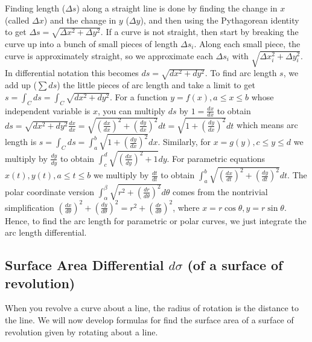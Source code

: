 {{{{{{{Finding length ({$\Delta s$}) along a straight line is done by finding the change in {$x$} (called {$\Delta x$}) and the change in {$y$} ({$\Delta y$}), and then using the Pythagorean identity to get {$\Delta s = \sqrt{\Delta x^2+\Delta y^2}$}. If a curve is not straight, then start by breaking the curve up into a bunch of small pieces of length {$\Delta s_i$}.  Along each small piece, the curve is approximately straight, so we approximate each {$\Delta s_i$} with {$\sqrt{\Delta x_i^2+\Delta y_i^2}$}. In differential notation this becomes $ds = \sqrt{dx^2+dy^2}$.  To find arc length {$s$}, we add up ({$\sum ds$}) the little pieces of arc length and take a limit to get {$s = \int_C ds = \int_C\sqrt{dx^2+dy^2}$}.  For a function $y=f(x), a\leq x\leq b$ whose independent variable is $x$, you can multiply $ds$ by $1=\frac{dx}{dx}$ to obtain $ ds = \sqrt{dx^2+dy^2}\frac{dx}{dx} = \sqrt{\left(\frac{dx}{dx}\right)^2+\left(\frac{dy}{dx}\right)^2}dt=\sqrt{1+\left(\frac{dy}{dx}\right)^2}dt$ which means arc length is $ s=\int_C ds = \int_a^b \sqrt{1+\left(\frac{dy}{dx}\right)^2}dx$. Similarly, for $x=g(y), c\leq y\leq d$ we multiply by $\frac{dy}{dy}$ to obtain
$ \int_c^d \sqrt{\left(\frac{dx}{dy}\right)^2+1}dy$. For 
parametric equations $x(t),y(t), a\leq t\leq b$ we multiply by $\frac{dt}{dt}$ to obtain $ \int_a^b \sqrt{\left(\frac{dx}{dt}\right)^2+\left(\frac{dy}{dt}\right)^2}dt$. 
The polar coordinate version $\int_\alpha^\beta \sqrt{r^2+\left(\frac{dr}{d\theta}\right)^2}d\theta$ comes from the nontrivial simplification $\left(\frac{dx}{d\theta}\right)^2+\left(\frac{dy}{d\theta}\right)^2 = r^2+\left(\frac{dr}{d\theta}\right)^2$, where $x=r\cos \theta, y=r \sin\theta$. 
Hence, to find the arc length for parametric or polar curves, we just integrate the arc length differential.


\subsection{Surface Area Differential $d\sigma$ (of a surface of revolution)}
When you revolve a curve about a line, the radius of rotation is the distance to the line. We will now develop formulas for find the surface area of a surface of revolution given by rotating about a line. 

}}}}}}}
